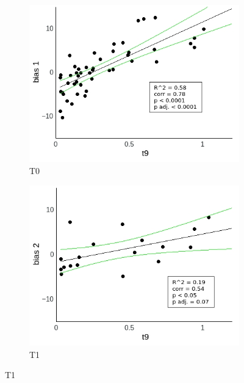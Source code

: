 \documentclass[a4paper]{scrreprt}
\begin{document}
\begin{figure}
\centering
\begin{subfigure}[b]{0.49\textwidth}
        \includegraphics[width=\textwidth]{figs/sec3/t9/t9no_diff_1_mod1dat.jpeg}
        \caption{T0}
    \end{subfigure}
    \begin{subfigure}[b]{0.49\textwidth}
        \includegraphics[width=\textwidth]{figs/sec3/t9/t9no_diff_2_mod1dat.jpeg}
        \caption{T1}
    \end{subfigure}


\end{figure}
\end{document}
